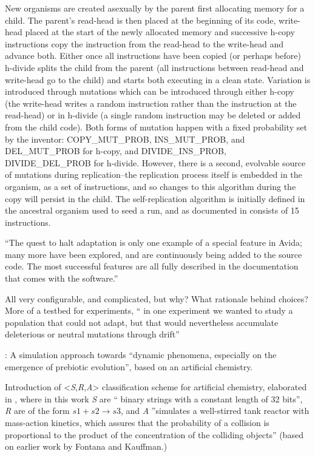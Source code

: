 New organisms are created asexually by the parent first allocating memory for a child. The parent's read-head is then placed at the beginning of its code, write-head placed at the start of the newly allocated memory and successive h-copy instructions copy the instruction from the read-head to the write-head and advance both. Either once all instructions have been copied (or perhaps before) h-divide splits the child from the parent (all instructions between read-head and write-head go to the child) and starts both executing in a clean state. Variation is introduced through mutations which can be introduced through either h-copy (the write-head writes a random instruction rather than the instruction at the read-head) or in h-divide (a single random instruction may be deleted or added from the child code). Both forms of mutation happen with a fixed probability set by the inventor: COPY\_MUT\_PROB, INS\_MUT\_PROB, and DEL\_MUT\_PROB for h-copy, and DIVIDE\_INS\_PROB, DIVIDE\_DEL\_PROB for h-divide. However, there is a second, evolvable source of mutations during replication--the replication process itself is embedded in the organism, as a set of instructions, and so changes to this algorithm during the copy will persist in the child. The self-replication algorithm is initially defined in the ancestral organism used to seed a run, and as documented in \cite[A1.3]{Ofria2004} consists of 15 instructions.

``The quest to halt adaptation is only one example of a special feature in Avida; many more have been explored, and are continuously being added to the source code. The most successful features are all fully described in the documentation that comes with the software.''

All very configurable, and complicated, but why? What rationale behind choices? More of a testbed for experiments, \eg `` in one experiment we wanted to study a population that could not adapt, but that would nevertheless accumulate deleterious or neutral mutations through drift''

\cite{Dittrich1998}:
A simulation approach towards ``dynamic phenomena, especially on the emergence of prebiotic evolution'', based on an artificial chemistry.

Introduction of \textless{}\emph{S},\emph{R},\emph{A}\textgreater{} classification scheme for artificial chemistry, elaborated in \parencite{Dittrich:2001zr}, where in this work \emph{S} are `` binary strings with a constant length of 32 bits'', \emph{R} are of the form $s1+s2 \rightarrow s3$, and \emph{A} ''simulates a well-stirred tank reactor with mass-action kinetics, which assures that the probability of a collision is proportional to the product of the concentration of the colliding objects'' (based on earlier work by Fontana and Kauffman.)


